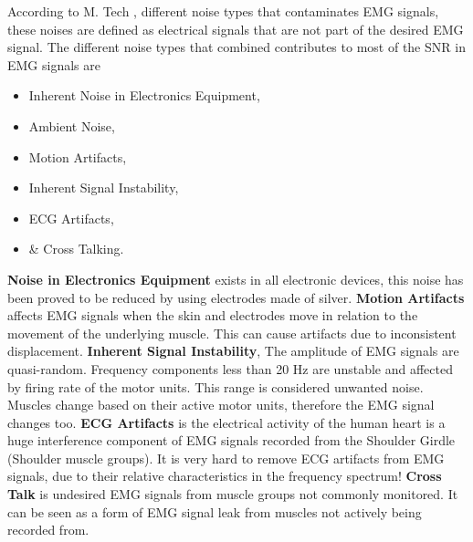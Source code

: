 \documentclass[../main.tex]{subfiles}
\begin{document}
According to M. Tech \cite{Tech2015}, different noise types that contaminates EMG signals, these noises are defined as electrical signals that are not part of the desired EMG signal.
The different noise types that combined contributes to most of the \gls{SNR} in EMG signals are
\begin{itemize}
\item Inherent Noise in Electronics Equipment,
\item Ambient Noise,
\item Motion Artifacts,
\item Inherent Signal Instability,
\item \gls{ECG} Artifacts,
\item \& Cross Talking.
\end{itemize}

\textbf{Noise in Electronics Equipment} exists in all electronic devices, this noise has been proved to be reduced by using electrodes made of silver.
\textbf{Motion Artifacts} affects EMG signals when the skin and electrodes move in relation to the movement of the underlying muscle.
This can cause artifacts due to inconsistent displacement.
\textbf{Inherent Signal Instability}, The amplitude of EMG signals are quasi-random. Frequency components less than 20 Hz are unstable and affected by firing rate of the motor units. This range is considered unwanted noise. Muscles change based on their active motor units, therefore the EMG signal changes too.
\textbf{ECG Artifacts} is the electrical activity of the human heart is a huge interference component of EMG signals recorded from the Shoulder Girdle (Shoulder muscle groups).
It is very hard to remove ECG artifacts from EMG signals, due to their relative characteristics in the frequency spectrum!
\textbf{Cross Talk} is undesired EMG signals from muscle groups not commonly monitored.
It can be seen as a form of EMG signal leak from muscles not actively being recorded from.

\end{document}
